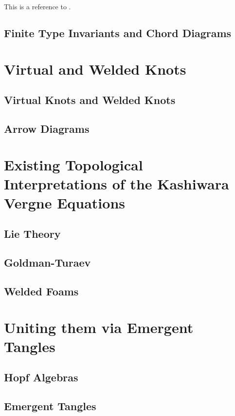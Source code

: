 \documentclass[12pt]{report}
\theoremstyle{upright}
\begin{document}
	This is a reference to \cite{the-knot-book}.

	\section{Finite Type Invariants and Chord Diagrams}

	\chapter{Virtual and Welded Knots}

	\section{Virtual Knots and Welded Knots}

	\section{Arrow Diagrams}

	\chapter{Existing Topological Interpretations of the Kashiwara Vergne Equations}

	\section{Lie Theory}

	\section{Goldman-Turaev}

	\section{Welded Foams}

	\chapter{Uniting them via Emergent Tangles}

	\section{Hopf Algebras}

	\section{Emergent Tangles}
\end{document}
